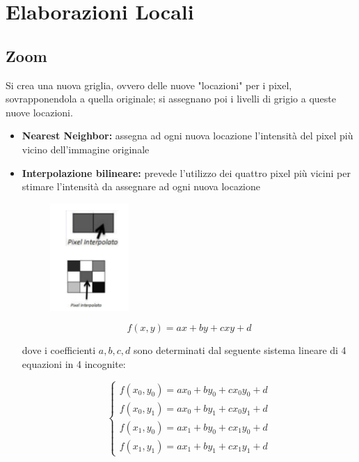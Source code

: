 \section{Elaborazioni Locali}

\subsection{Zoom}

Si crea una nuova griglia, ovvero delle nuove "locazioni" per i pixel,
sovrapponendola a quella originale; si assegnano poi i livelli di grigio a
queste nuove locazioni.

\begin{itemize}
    \item \textbf{Nearest Neighbor:} assegna ad ogni nuova locazione l'intensità
          del pixel più vicino dell'immagine originale

    \item \textbf{Interpolazione bilineare:} prevede l'utilizzo dei quattro
          pixel più vicini per stimare l'intensità da assegnare ad ogni nuova
          locazione

          \begin{figure}[H]
              \centering
              \includegraphics[width=3cm, keepaspectratio]{capitoli/immagini/imgs/esempio-interpolazione.png}
          \end{figure}

          $$
              f(x,y)=ax+by+cxy+d
          $$

          dove i coefficienti $a, b, c, d$ sono determinati dal seguente sistema
          lineare di 4 equazioni in 4 incognite:

          $$
              \left\{\begin{array}{l}
                  f\left(x_0, y_0\right)=a x_0+b y_0+c x_0 y_0+d \\
                  f\left(x_0, y_1\right)=a x_0+b y_1+c x_0 y_1+d \\
                  f\left(x_1, y_0\right)=a x_1+b y_0+c x_1 y_0+d \\
                  f\left(x_1, y_1\right)=a x_1+b y_1+c x_1 y_1+d
              \end{array}\right.
          $$


\end{itemize}
